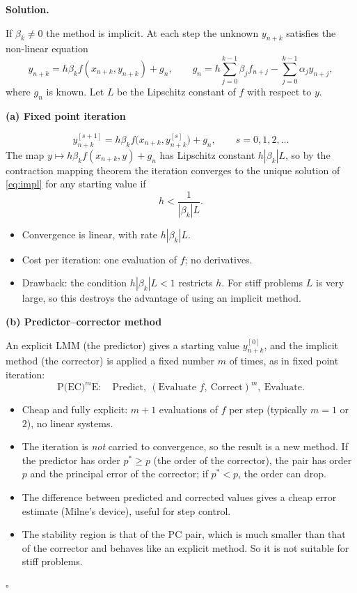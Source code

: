 \documentclass[11pt,a4paper]{article}
\newenvironment{solution}
  {\par\noindent\textbf{Solution.}\par\nobreak}
  {\par\hfill\(\square\)\par}
\newcommand{\step}[1]{\par\addvspace{0.5em}\noindent\textbf{#1}\par\nobreak}
\begin{document}
\begin{solution}
If \(\beta_k\ne0\) the method is implicit.  At each step the unknown
\(y_{n+k}\) satisfies the non-linear equation
\begin{equation}\label{eq:impl}
  y_{n+k}=h\beta_kf(x_{n+k},y_{n+k})+g_n,
  \qquad
  g_n=h\sum_{j=0}^{k-1}\beta_jf_{n+j}-\sum_{j=0}^{k-1}\alpha_jy_{n+j},
\end{equation}
where \(g_n\) is known.  Let \(L\) be the Lipschitz constant of \(f\)
with respect to \(y\).

\step{(a) Fixed point iteration}
\[
  y_{n+k}^{[s+1]}=h\beta_kf\bigl(x_{n+k},y_{n+k}^{[s]}\bigr)+g_n,
  \qquad s=0,1,2,\dots
\]
The map \(y\mapsto h\beta_kf(x_{n+k},y)+g_n\) has Lipschitz constant
\(h|\beta_k|L\), so by the contraction mapping theorem the iteration
converges to the unique solution of \eqref{eq:impl} for any starting
value if
\[
  h<\frac1{|\beta_k|L}.
\]
\begin{itemize}
  \item Convergence is linear, with rate \(h|\beta_k|L\).
  \item Cost per iteration: one evaluation of \(f\); no derivatives.
  \item Drawback: the condition \(h|\beta_k|L<1\) restricts \(h\).  For
    stiff problems \(L\) is very large, so this destroys the advantage
    of using an implicit method.
\end{itemize}

\step{(b) Predictor--corrector method}
An explicit LMM (the predictor) gives a starting value
\(y_{n+k}^{[0]}\), and the implicit method (the corrector) is applied a
fixed number \(m\) of times, as in fixed point iteration:
\[
  \text{P(EC)}^m\text{E}:\quad
  \text{Predict},\ (\text{Evaluate }f,\ \text{Correct})^m,\ \text{Evaluate}.
\]
\begin{itemize}
  \item Cheap and fully explicit: \(m+1\) evaluations of \(f\) per step
    (typically \(m=1\) or \(2\)), no linear systems.
  \item The iteration is \emph{not} carried to convergence, so the
    result is a new method.  If the predictor has order \(p^*\ge p\)
    (the order of the corrector), the pair has order \(p\) and the
    principal error of the corrector; if \(p^*<p\), the order can drop.
  \item The difference between predicted and corrected values gives a
    cheap error estimate (Milne's device), useful for step control.
  \item The stability region is that of the PC pair, which is much
    smaller than that of the corrector and behaves like an explicit
    method.  So it is not suitable for stiff problems.
\end{itemize}


\end{solution}
\end{document}
